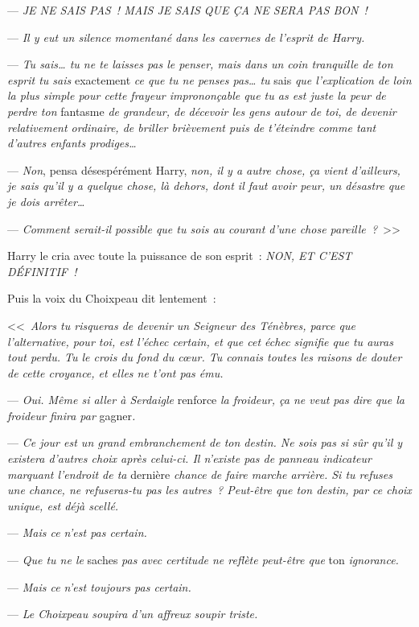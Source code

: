 --- \emph{JE NE SAIS PAS~! MAIS JE SAIS QUE ÇA NE SERA PAS BON~!}

--- \emph{Il y eut un silence momentané dans les cavernes de l'esprit de Harry.}

--- \emph{Tu sais… tu ne te laisses pas le penser, mais dans un coin tranquille de ton esprit tu sais} exactement \emph{ce que tu ne penses pas… tu} sais \emph{que l'explication de loin la plus simple pour cette frayeur imprononçable que tu as est juste la peur de perdre ton} fantasme \emph{de grandeur, de décevoir les gens autour de toi, de devenir relativement ordinaire, de briller brièvement puis de t'éteindre comme tant d'autres enfants prodiges…}

--- \emph{Non}, pensa désespérément Harry, \emph{non, il y a autre chose, ça vient d'ailleurs, je sais qu'il y a quelque chose, là dehors, dont il faut avoir peur, un désastre que je dois arrêter…}

--- \emph{Comment serait-il possible que tu sois au courant d'une chose pareille~?}~>>

Harry le cria avec toute la puissance de son esprit~: \emph{NON, ET C'EST DÉFINITIF~!}

Puis la voix du Choixpeau dit lentement~:

<<~\emph{Alors tu risqueras de devenir un Seigneur des Ténèbres, parce que l'alternative, pour toi, est l'échec certain, et que cet échec signifie que tu auras tout perdu. Tu le crois du fond du cœur. Tu connais toutes les raisons de douter de cette croyance, et elles ne t'ont pas ému.}

--- \emph{Oui. Même si aller à Serdaigle} renforce \emph{la froideur, ça ne veut pas dire que la froideur finira par} gagner\emph{.}

--- \emph{Ce jour est un grand embranchement de ton destin. Ne sois pas si sûr qu'il y existera d'autres choix après celui-ci. Il n'existe pas de panneau indicateur marquant l'endroit de ta} dernière \emph{chance de faire marche arrière. Si tu refuses une chance, ne refuseras-tu pas les autres~? Peut-être que ton destin, par ce choix unique, est déjà scellé.}

--- \emph{Mais ce n'est pas certain.}

--- \emph{Que tu ne le} saches \emph{pas avec certitude ne reflète peut-être que} ton \emph{ignorance.}

--- \emph{Mais ce n'est toujours pas certain.}

--- \emph{Le Choixpeau soupira d'un affreux soupir triste.}

